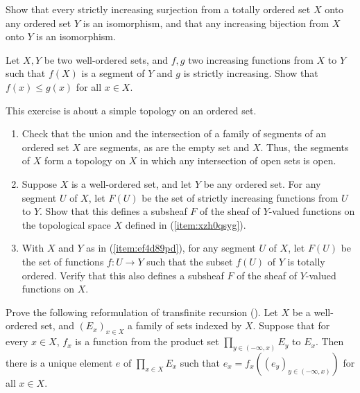 \documentclass{article}
\begin{document}
\begin{exercise}
  \label{exe:v1tw1ijd}
  Show that every strictly increasing surjection from a totally
  ordered set \(X\) onto any ordered set \(Y\) is an isomorphism, and
  that any increasing bijection from \(X\) onto \(Y\) is an
  isomorphism.
\end{exercise}

\begin{exercise}
  \label{exe:gsdhavsp}
  Let \(X, Y\) be two well-ordered sets, and \(f, g\) two increasing
  functions from \(X\) to \(Y\) such that \(f(X)\) is a segment of
  \(Y\) and \(g\) is strictly increasing.  Show that
  \(f(x) \leq g(x)\) for all \(x \in X\).
\end{exercise}

\begin{exercise}
  \label{exe:rpm18mof}
  This exercise is about a simple topology on an ordered set.
  \begin{enumerate}
  \item \label{item:xzh0qsyg} Check that the union and the
    intersection of a family of segments of an ordered set \(X\) are
    segments, as are the empty set and \(X\).  Thus, the segments of
    \(X\) form a topology on \(X\) in which any intersection of open
    sets is open.
  \item \label{item:ef4d89pd} Suppose \(X\) is a well-ordered set, and
    let \(Y\) be any ordered set.  For any segment \(U\) of \(X\), let
    \(F(U)\) be the set of strictly increasing functions from \(U\) to
    \(Y\).  Show that this defines a subsheaf \(F\) of the sheaf of
    \(Y\)-valued functions on the topological space \(X\) defined in
    (\ref{item:xzh0qsyg}).
  \item With \(X\) and \(Y\) as in (\ref{item:ef4d89pd}), for any
    segment \(U\) of \(X\), let \(F(U)\) be the set of functions
    \(f : U \to Y\) such that the subset \(f(U)\) of \(Y\) is totally
    ordered.  Verify that this also defines a subsheaf \(F\) of the
    sheaf of \(Y\)-valued functions on \(X\).
  \end{enumerate}
\end{exercise}

\begin{exercise}
  \label{exe:oh59gz4i}
  Prove the following reformulation of transfinite recursion
  ().  Let \(X\) be a well-ordered set, and
  \((E_x)_{x \in X}\) a family of sets indexed by \(X\).  Suppose that
  for every \(x \in X\), \(f_x\) is a function from the product set
  \(\prod_{y \in (-\infty, x)} E_y\) to \(E_x\).  Then there is a
  unique element \(e\) of \(\prod_{x \in X} E_x\) such that
  \(e_x = f_x((e_y)_{y \in (-\infty, x)})\) for all \(x \in X\).
\end{exercise}
\end{document}

